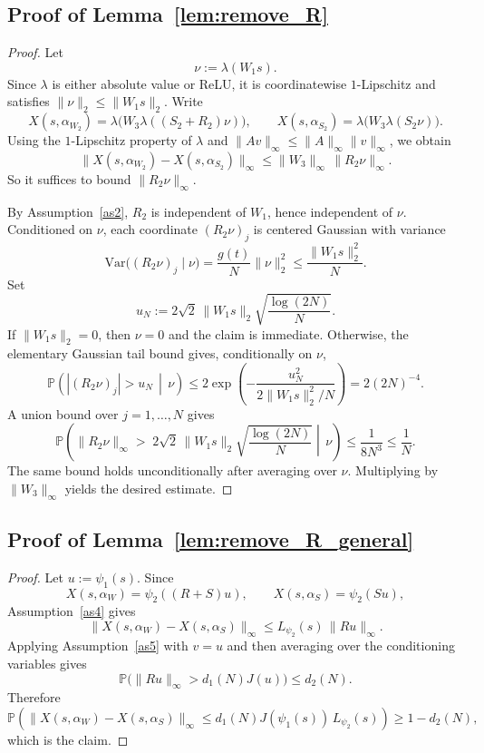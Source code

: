 \documentclass[11pt]{article}
\theoremstyle{plain}
\theoremstyle{definition}
\theoremstyle{remark}
\newcommand{\PP}{\mathbb{P}}
\newcommand{\1}{\mathbf{1}}
\begin{document}
\subsection{Proof of Lemma~\ref{lem:remove_R}}

\begin{proof}
Let
\[
\nu:=\lambda(W_1s).
\]
Since \(\lambda\) is either absolute value or ReLU, it is coordinatewise \(1\)-Lipschitz and satisfies \(\|\nu\|_2\le \|W_1s\|_2\). Write
\[
X(s,\alpha_{W_2})=\lambda\big(W_3\lambda((S_2+R_2)\nu)\big),
\qquad
X(s,\alpha_{S_2})=\lambda\big(W_3\lambda(S_2\nu)\big).
\]
Using the \(1\)-Lipschitz property of \(\lambda\) and \(\|Av\|_\infty\le \|A\|_\infty\|v\|_\infty\), we obtain
\[
\big\|X(s,\alpha_{W_2})-X(s,\alpha_{S_2})\big\|_\infty
\le
\|W_3\|_\infty\,\|R_2\nu\|_\infty.
\]
So it suffices to bound \(\|R_2\nu\|_\infty\).

By Assumption~\ref{as2}, \(R_2\) is independent of \(W_1\), hence independent of \(\nu\). Conditioned on \(\nu\), each coordinate \((R_2\nu)_j\) is centered Gaussian with variance
\[
\mathrm{Var}\big((R_2\nu)_j\mid \nu\big)
=
\frac{g(t)}{N}\|\nu\|_2^2
\le
\frac{\|W_1s\|_2^2}{N}.
\]
Set
\[
u_N:=2\sqrt{2}\,\|W_1s\|_2\sqrt{\frac{\log(2N)}{N}}.
\]
If \(\|W_1s\|_2=0\), then \(\nu=0\) and the claim is immediate. Otherwise, the elementary Gaussian tail bound gives, conditionally on \(\nu\),
\[
\PP\!\left(|(R_2\nu)_j|>u_N\,\middle|\,\nu\right)
\le
2\exp\!\left(
-\frac{u_N^2}{2\|W_1s\|_2^2/N}
\right)
=2(2N)^{-4}.
\]
A union bound over \(j=1,\dots,N\) gives
\[
\PP\!\left(
\|R_2\nu\|_\infty >
\;2\sqrt{2}\,\|W_1s\|_2\sqrt{\frac{\log(2N)}{N}}
\middle|\,\nu
\right)
\le
\frac{1}{8N^3}
\le
\frac{1}{N}.
\]
The same bound holds unconditionally after averaging over \(\nu\).
Multiplying by \(\|W_3\|_\infty\) yields the desired estimate.
\end{proof}

\subsection{Proof of Lemma~\ref{lem:remove_R_general}}

\begin{proof}
Let \(u:=\psi_1(s)\). Since
\[
X(s,\alpha_W)=\psi_2((R+S)u),
\qquad
X(s,\alpha_S)=\psi_2(Su),
\]
Assumption~\ref{as4} gives
\[
\|X(s,\alpha_W)-X(s,\alpha_S)\|_\infty
\le
L_{\psi_2}(s)\,\|Ru\|_\infty.
\]
Applying Assumption~\ref{as5} with \(v=u\) and then averaging over the conditioning variables gives
\[
\PP\big(\|Ru\|_\infty>d_1(N)J(u)\big)\le d_2(N).
\]
Therefore
\[
\PP\!\left(
\|X(s,\alpha_W)-X(s,\alpha_S)\|_\infty
\le
d_1(N)J(\psi_1(s))\,L_{\psi_2}(s)
\right)\ge 1-d_2(N),
\]
which is the claim.
\end{proof}
\end{document}
